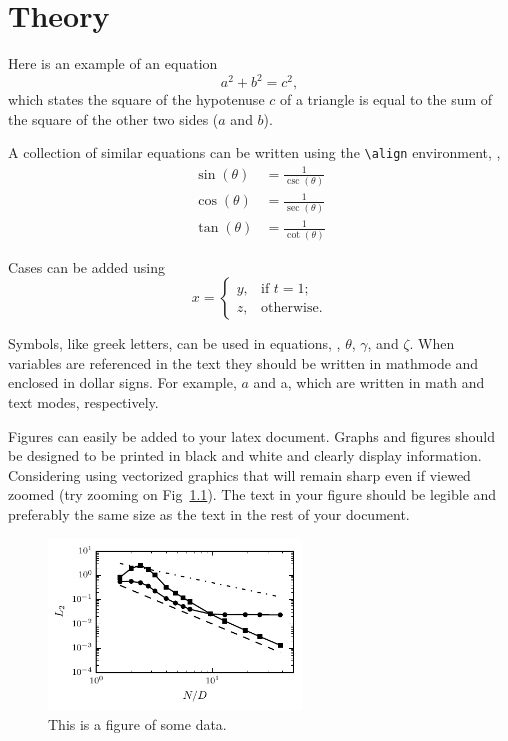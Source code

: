 \chapter{Theory} \label{CH:theory}

\label{Sect:eqns}
Here is an example of an equation
\begin{equation}\label{eq:pyth}
  a^2+b^2=c^2,
\end{equation}
which states the square of the hypotenuse $c$ of a triangle is equal to the sum of the square of the other two sides ($a$ and $b$). 

A collection of similar equations can be written using the \verb|\align| environment, \eg, 
\begin{align}\label{eq:trig}
  \sin(\theta) &= \frac{1}{\csc(\theta)}\\
  \cos(\theta) &= \frac{1}{\sec(\theta)}\\
  \tan(\theta) &= \frac{1}{\cot(\theta)}
\end{align}

Cases can be added using
\begin{equation}
  x = \begin{cases}
    y, & \text{if $t = 1$;} \\
    z, & \text{otherwise.}
  \end{cases}
\end{equation}

\label{Sect:sym}
Symbols, like greek letters, can be used in equations, \eg, $\theta$, $\gamma$, and $\zeta$.  When variables are referenced in the text they should be written in mathmode and enclosed in dollar signs.  For example, $a$ and a, which are written in math and text modes, respectively.

\label{Sect:figs}
Figures can easily be added to your latex document.  Graphs and figures should be designed to be printed in black and white and clearly display information.  Considering using vectorized graphics that will remain sharp even if viewed zoomed (try zooming on Fig~\ref{fig:plot}).  The text in your figure should be legible and preferably the same size as the text in the rest of your document.

\begin{figure}[htbp]
  \centering
  \includegraphics[width=0.6\textwidth]{figs/plot.pdf}
  \caption{This is a figure of some data.}
  \label{fig:plot}
\end{figure}

